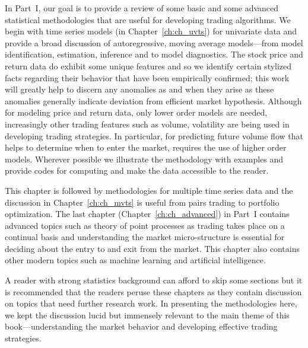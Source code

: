 
In Part~I, our goal is to provide a review of some basic and some advanced statistical methodologies that are useful for developing trading algorithms. We begin with time series models (in Chapter~\ref{ch:ch_uvts}) for univariate data and provide a broad discussion of autoregressive, moving average models---from model identification, estimation, inference and to model diagnostics. The stock price and return data do exhibit some unique features and so we identify certain stylized facts regarding their behavior that have been empirically confirmed; this work will greatly help to discern any anomalies as and when they arise as these anomalies generally indicate deviation from efficient market hypothesis. Although for modeling price and return data, only lower order models are needed, increasingly other trading features such as volume, volatility are being used in developing trading strategies. In particular, for predicting future volume flow that helps to determine when to enter the market, requires the use of higher order models. Wherever possible we illustrate the methodology with examples and provide codes for computing and make the data accessible to the reader. 


This chapter is followed by methodologies for multiple time series data and the discussion in Chapter~\ref{ch:ch_mvts} is useful from pairs trading to portfolio optimization. The last chapter (Chapter~\ref{ch:ch_advanced}) in Part~I contains advanced topics such as theory of point processes as trading takes place on a continual basis and understanding the market micro-structure is essential for deciding about the entry to and exit from the market. This chapter also contains other modern topics such as machine learning and artificial intelligence. 


A reader with strong statistics background can afford to skip some sections but it is recommended that the readers peruse these chapters as they contain discussion on topics that need further research work. In presenting the methodologies here, we kept the discussion lucid but immensely relevant to the main theme of this book---understanding the market behavior and developing effective trading strategies. 